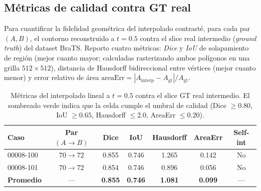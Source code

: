 %

\subsection{Métricas de calidad contra GT real}
\label{subsec:metricas-gt}

Para cuantificar la fidelidad geométrica del interpolado contrasté, para cada
par $(A, B)$, el contorno reconstruido a $t = 0.5$ contra el slice real
intermedio (\emph{ground truth}) del dataset BraTS. Reporto cuatro métricas:
\emph{Dice} y \emph{IoU} de solapamiento de región (mejor cuanto mayor;
calculadas rasterizando ambos polígonos en una grilla $512\!\times\!512$),
distancia de Hausdorff bidireccional entre vértices (mejor cuanto menor) y
error relativo de área $\mathrm{areaErr}=|A_{\text{interp}}-A_{\text{gt}}|/A_{\text{gt}}$.

\begin{table}[h]
  \centering
  \small
  \begin{tabular}{lcccccc}
    \toprule
    Caso & Par $(A \!\to\! B)$ & Dice & IoU & Hausdorff & AreaErr & Self-int \\
    \midrule
    00008-100 & $70 \!\to\! 72$ &
      \cellcolor{cellgood}0.855 & \cellcolor{cellgood}0.746 &
      \cellcolor{cellgood}1.265 & \cellcolor{cellgood}0.142 & No \\
    00008-101 & $70 \!\to\! 72$ &
      \cellcolor{cellgood}0.854 & \cellcolor{cellgood}0.746 &
      \cellcolor{cellgood}0.896 & \cellcolor{cellgood}0.056 & No \\
    \midrule
    \textbf{Promedio} & --- &
      \textbf{0.855} & \textbf{0.746} &
      \textbf{1.081} & \textbf{0.099} & --- \\
    \bottomrule
  \end{tabular}
  \caption{Métricas del interpolado lineal a $t=0.5$ contra el slice GT real
  intermedio. El sombreado verde indica que la celda cumple el umbral de
  calidad (Dice $\geq 0.80$, IoU $\geq 0.65$, Hausdorff $\leq 2.0$,
  AreaErr $\leq 0.20$).}
  \label{tab:metricas-gt}
\end{table}

